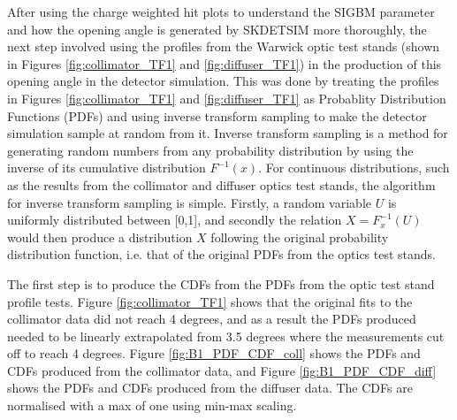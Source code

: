 After using the charge weighted hit plots to understand the SIGBM parameter and how the opening angle is generated by SKDETSIM more thoroughly, the next step involved using the profiles from the Warwick optic test stands (shown in Figures \ref{fig:collimator_TF1} and \ref{fig:diffuser_TF1}) in the production of this opening angle in the detector simulation. This was done by treating the profiles in Figures \ref{fig:collimator_TF1} and \ref{fig:diffuser_TF1} as Probablity Distribution Functions (PDFs) and using inverse transform sampling to make the detector simulation sample at random from it. Inverse transform sampling is a method for generating random numbers from any probability distribution by using the inverse of its cumulative distribution $F^{-1}(x)$. For continuous distributions, such as the results from the collimator and diffuser optics test stands, the algorithm for inverse transform sampling is simple. Firstly, a random variable $U$ is uniformly distributed between [0,1], and secondly the relation $X = F^{-1}_{x}(U)$ would then produce a distribution $X$ following the original probability distribution function, i.e. that of the original PDFs from the optics test stands. 

The first step is to produce the CDFs from the PDFs from the optic test stand profile tests. Figure \ref{fig:collimator_TF1} shows that the original fits to the collimator data did not reach 4 degrees, and as a result the PDFs produced needed to be linearly extrapolated from 3.5 degrees where the measurements cut off to reach 4 degrees. Figure \ref{fig:B1_PDF_CDF_coll} shows the PDFs and CDFs produced from the collimator data, and Figure \ref{fig:B1_PDF_CDF_diff} shows the PDFs and CDFs produced from the diffuser data. The CDFs are normalised with a max of one using min-max scaling.


